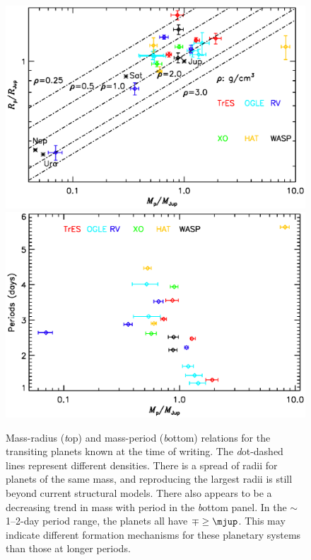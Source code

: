 \begin{figure}
\begin{center}
\centering
\includegraphics[width=.90\textwidth]{1_radii}\\
\includegraphics[width=.90\textwidth]{1_periods}\\
\caption[Mass-radius and mass-period relations for transiting planets]{%
Mass-radius ({\textit top}) and mass-period ({\textit bottom}) relations for the transiting planets known at the time of writing.
The {\textit dot-dashed lines} represent different densities.
There is a spread of radii for planets of the same mass, and reproducing the largest radii is still beyond current structural models.
There also appears to be a decreasing trend in mass with period in the {\textit bottom panel}.
In the $\sim$1--2-day period range, the planets all have $\mp \geq \mjup$.
This may indicate different formation mechanisms for these planetary systems than those at longer periods.
}\label{cha:intro:sec:methods:sub:trans:fig:tp}
\end{center}
\end{figure}

